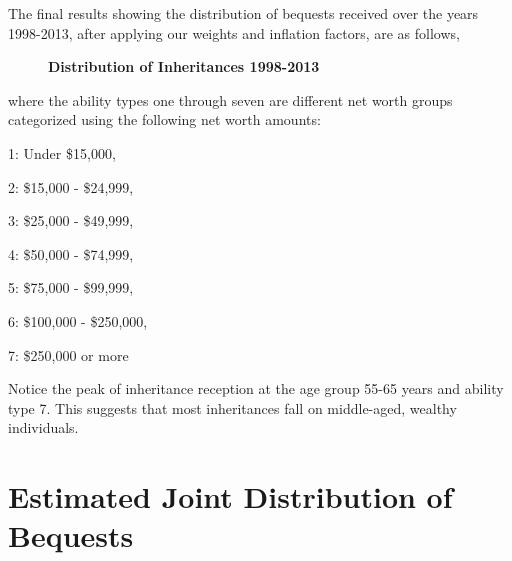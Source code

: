 \documentclass[letterpaper,12pt]{article}
\theoremstyle{definition}
\begin{document}
\begin{spacing}{1.5}
  The final results showing the distribution of bequests received over the years 1998-2013, after applying our weights and inflation factors, are as follows,\\
  \begin{figure}[htbp]\centering \captionsetup{width=4.0in}
    \caption{\label{proportions}\textbf{Distribution of Inheritances 1998-2013}}
  \end{figure}

  where the ability types one through seven are different net worth groups categorized using the following net worth amounts:

  1: Under \$15,000,

  2: \$15,000 - \$24,999,

  3: \$25,000 - \$49,999,

  4: \$50,000 - \$74,999,

  5: \$75,000 - \$99,999,

  6: \$100,000 - \$250,000,

  7: \$250,000 or more

  Notice the peak of inheritance reception at the age group 55-65 years and ability type 7. This suggests that most inheritances fall on middle-aged, wealthy individuals.

\section{Estimated Joint Distribution of Bequests}\label{SecDist}


\end{spacing}
\end{document}
